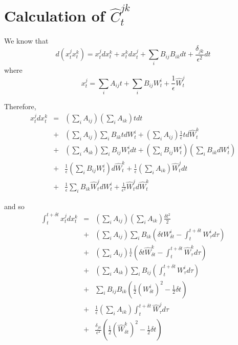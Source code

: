 \documentclass[12pt]{article}
\begin{document}
\section{Calculation of $\hat{C}_t^{jk}$}
We know that
\begin{equation}
d(x_t^j x_t^k) = x_t^j dx_t^k + x_t^k dx_t^j + \sum_i B_{ij} B_{ik} dt + \frac{\delta_{jk}}{\epsilon^2} dt
\end{equation}
%
where
%
\begin{equation}
x_t^j = \sum_i A_{ij} t + \sum_i B_{ij} W_t^i + \frac{1}{\epsilon} \hat{W}_t^j
\end{equation}

Therefore, 
\begin{eqnarray}
x_t^j dx_t^k 
&=& \left( \sum_i A_{ij} \right) \left( \sum_i A_{ik} \right) t dt \\
&+& \left( \sum_i A_{ij} \right) \sum_i B_{ik} t dW_t^i 
+ \left( \sum_i A_{ij} \right) \frac{1}{\epsilon} t d\hat{W}_t^k \\
&+& \left( \sum_i A_{ik} \right) \sum_i B_{ij} W_t^i dt 
+ \left( \sum_i B_{ij} W_t^i \right) \left( \sum_i B_{ik} dW_t^i \right) \\
&+& \frac{1}{\epsilon} \left(\sum_i B_{ij} W_t^i \right) d\hat{W}_t^k 
+ \frac{1}{\epsilon} \left(\sum_i A_{ik} \right) \hat{W}_t^j dt \\
&+& \frac{1}{\epsilon}\sum_i B_{ik} \hat{W}_t^j dW_t^i 
+ \frac{1}{\epsilon^2} \hat{W}_t^j d\hat{W}_t^k
\end{eqnarray}




and so
\begin{eqnarray}
\int_t^{t + \delta t} x_t^j dx_t^k &=& \left( \sum_i A_{ij} \right) \left( \sum_i A_{ik} \right) \frac{\delta t^2}{2} \\
&+& \left( \sum_i A_{ij} \right) \sum_i B_{ik} \left(\delta t W_{\delta t}^i -\int_t^{t + \delta t} W_\tau^i d\tau \right) \\
&+& \left( \sum_i A_{ij} \right) \frac{1}{\epsilon} \left(\delta t \hat{W}_{\delta t}^k -\int_t^{t + \delta t} \hat{W}_\tau^k d\tau \right) \\
&+& \left( \sum_i A_{ik} \right) \sum_i B_{ij} \left( \int_t^{t + \delta t} W_\tau^i d\tau \right) \\ 
&+& \sum_i B_{ij} B_{ik} \left( \frac{1}{2} \left(W_{\delta t}^i\right)^2 - \frac{1}{2} \delta t \right)  \\
&+& \frac{1}{\epsilon} \left(\sum_i A_{ik} \right) \int_t^{t + \delta t} \hat{W}_\tau^j d\tau \\
&+& \frac{\delta_{jk}}{\epsilon^2} \left( \frac{1}{2} (\hat{W}_{\delta t}^k)^2 - \frac{1}{2} \delta t \right)
\end{eqnarray}
\end{document}
